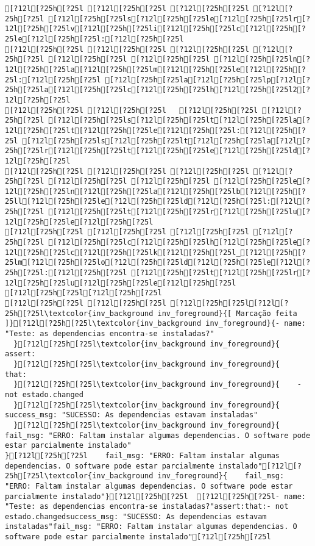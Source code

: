 \documentclass{scrartcl}
\begin{document}
\begin{Verbatim}
[?12l[?25h[?25l [?12l[?25h[?25l [?12l[?25h[?25l [?12l[?25h[?25l [?12l[?25h[?25ls[?12l[?25h[?25le[?12l[?25h[?25lr[?12l[?25h[?25lv[?12l[?25h[?25li[?12l[?25h[?25lc[?12l[?25h[?25le[?12l[?25h[?25l:[?12l[?25h[?25l
[?12l[?25h[?25l [?12l[?25h[?25l [?12l[?25h[?25l [?12l[?25h[?25l [?12l[?25h[?25l [?12l[?25h[?25l [?12l[?25h[?25ln[?12l[?25h[?25la[?12l[?25h[?25lm[?12l[?25h[?25le[?12l[?25h[?25l:[?12l[?25h[?25l [?12l[?25h[?25la[?12l[?25h[?25lp[?12l[?25h[?25la[?12l[?25h[?25lc[?12l[?25h[?25lh[?12l[?25h[?25l2[?12l[?25h[?25l
[?12l[?25h[?25l [?12l[?25h[?25l   [?12l[?25h[?25l [?12l[?25h[?25l [?12l[?25h[?25ls[?12l[?25h[?25lt[?12l[?25h[?25la[?12l[?25h[?25lt[?12l[?25h[?25le[?12l[?25h[?25l:[?12l[?25h[?25l [?12l[?25h[?25ls[?12l[?25h[?25lt[?12l[?25h[?25la[?12l[?25h[?25lr[?12l[?25h[?25lt[?12l[?25h[?25le[?12l[?25h[?25ld[?12l[?25h[?25l
[?12l[?25h[?25l [?12l[?25h[?25l [?12l[?25h[?25l [?12l[?25h[?25l [?12l[?25h[?25l [?12l[?25h[?25l [?12l[?25h[?25le[?12l[?25h[?25ln[?12l[?25h[?25la[?12l[?25h[?25lb[?12l[?25h[?25ll[?12l[?25h[?25le[?12l[?25h[?25ld[?12l[?25h[?25l:[?12l[?25h[?25l [?12l[?25h[?25lt[?12l[?25h[?25lr[?12l[?25h[?25lu[?12l[?25h[?25le[?12l[?25h[?25l
[?12l[?25h[?25l [?12l[?25h[?25l [?12l[?25h[?25l [?12l[?25h[?25l [?12l[?25h[?25lc[?12l[?25h[?25lh[?12l[?25h[?25le[?12l[?25h[?25lc[?12l[?25h[?25lk[?12l[?25h[?25l_[?12l[?25h[?25lm[?12l[?25h[?25lo[?12l[?25h[?25ld[?12l[?25h[?25le[?12l[?25h[?25l:[?12l[?25h[?25l [?12l[?25h[?25lt[?12l[?25h[?25lr[?12l[?25h[?25lu[?12l[?25h[?25le[?12l[?25h[?25l
[?12l[?25h[?25l[?12l[?25h[?25l
[?12l[?25h[?25l [?12l[?25h[?25l [?12l[?25h[?25l[?12l[?25h[?25l\textcolor{inv_background inv_foreground}{[ Marcação feita ]}[?12l[?25h[?25l\textcolor{inv_background inv_foreground}{- name: "Teste: as dependencias encontra-se instaladas?"
  }[?12l[?25h[?25l\textcolor{inv_background inv_foreground}{  assert:
  }[?12l[?25h[?25l\textcolor{inv_background inv_foreground}{    that:
  }[?12l[?25h[?25l\textcolor{inv_background inv_foreground}{    - not estado.changed
  }[?12l[?25h[?25l\textcolor{inv_background inv_foreground}{    success_msg: "SUCESSO: As dependencias estavam instaladas"
  }[?12l[?25h[?25l\textcolor{inv_background inv_foreground}{    fail_msg: "ERRO: Faltam instalar algumas dependencias. O software pode estar parcialmente instalado"
}[?12l[?25h[?25l    fail_msg: "ERRO: Faltam instalar algumas dependencias. O software pode estar parcialmente instalado"[?12l[?25h[?25l\textcolor{inv_background inv_foreground}{    fail_msg: "ERRO: Faltam instalar algumas dependencias. O software pode estar parcialmente instalado"}[?12l[?25h[?25l  [?12l[?25h[?25l- name: "Teste: as dependencias encontra-se instaladas?"assert:that:- not estado.changedsuccess_msg: "SUCESSO: As dependencias estavam instaladas"fail_msg: "ERRO: Faltam instalar algumas dependencias. O software pode estar parcialmente instalado"[?12l[?25h[?25l

\end{Verbatim}
\end{document}
